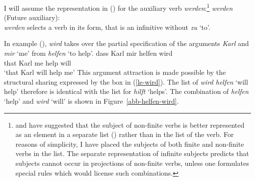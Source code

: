 I will assume the representation in () for the auxiliary verb \emph{werden}:\footnote{\label{subj-fn}%
	 \citet{Pollard90a} and \citet*{Kiss92} have suggested that the subject of non-finite verbs is better represented
	 as an element in a separate list (\subj) rather than in the \comps list of the verb. For reasons of simplicity,
	 I have placed the subjects of both finite and non-finite verbs in the \comps list. The separate representation of infinite
	 subjects predicts that subjects cannot occur in projections of non-finite verbs, unless one formulates special rules which would
	 license such combinations.%
}
\eas
\label{le-wird}
\emph{werden} (Future auxiliary):\\
\zs
\emph{werden} selects a verb in its  form, that is an infinitive without \emph{zu} `to'.

In example (), \emph{wird} takes over the partial specification of the arguments \emph{Karl} and
\emph{mir} `me' from \emph{helfen} `to help'.
\ea
\gll dass Karl mir helfen wird\\
	 that Karl me help will\\
\glt `that Karl will help me'
\z
This argument attraction is made possible by the structural sharing expressed by the box 
in (\ref{le-wird}). The \comps list of \emph{wird helfen} `will help' therefore is identical
with  the \comps list for \emph{hilft} `helps'. The combination of \emph{helfen} `help' and
 \emph{wird} `will' is shown in Figure~\vref{abb-helfen-wird}. 

